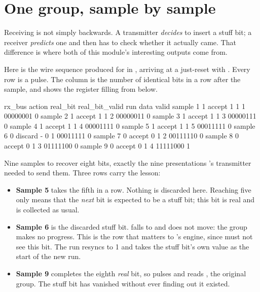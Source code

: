 \section{One group, sample by sample}
\label{c15:sec:trace}

Receiving is not simply  backwards. A transmitter \emph{decides} to insert a stuff
bit; a receiver \emph{predicts} one and then has to check whether it actually came. That difference
is where both of this module's interesting outputs come from.

Here is the wire sequence  produced for  in
, arriving at a just-reset  with . Every
row is a  pulse. The  column is the number of identical bits in a row after the
sample, and  shows the register filling from below.

\begin{textdrawing}
            rx_bus     action  real_bit  real_bit_valid    run      data  valid
sample 1         1     accept         1               1     1  00000001      0
sample 2         1     accept         1               1     2  00000011      0
sample 3         1     accept         1               1     3  00000111      0
sample 4         1     accept         1               1     4  00001111      0
sample 5         1     accept         1               1     5  00011111      0
sample 6         0    discard         -               0     1  00011111      0
sample 7         0     accept         0               1     2  00111110      0
sample 8         0     accept         0               1     3  01111100      0
sample 9         0     accept         0               1     4  11111000      1
\end{textdrawing}

Nine samples to recover eight bits, exactly the nine presentations 's transmitter
needed to send them. Three rows carry the lesson:
\begin{itemize}
  \item \textbf{Sample 5} takes the fifth  in a row. Nothing is discarded here. Reaching
    five only means that the \emph{next} bit is expected to be a stuff bit; this bit is real and is
    collected as usual.
  \item \textbf{Sample 6} is the discarded stuff bit.  falls to  and
     does not move: the group makes no progress. This is the row that matters to
    's engine, since  must not see this bit. The run resyncs to 1 and
    takes the stuff bit's own value as the start of the new run.
  \item \textbf{Sample 9} completes the eighth \emph{real} bit, so  pulses and
     reads , the original group. The stuff bit has vanished without
     ever finding out it existed.
\end{itemize}

